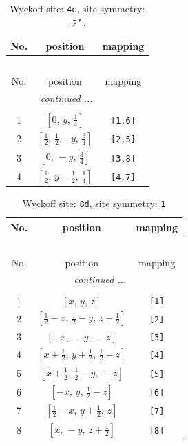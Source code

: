\documentclass[fleqn,8pt]{jsarticle}
\begin{document}
\renewcommand{\arraystretch}{1.2}
\begin{longtable}{ccc}
\caption{Wyckoff site: {\tt 4c}, site symmetry: {\tt .2'.}}
 \\
 \hline \hline
No. & position & mapping \\ \hline \endfirsthead

\multicolumn{2}{l}{\tablename\ \thetable{}} \\
 \hline \hline
No. & position & mapping \\ \hline \endhead

 \hline \hline
\multicolumn{2}{r}{\footnotesize\it continued ...} \\ \endfoot

 \hline \hline
\multicolumn{2}{r}{} \\ \endlastfoot

1 & $\left[ 0,\, y,\, \frac{1}{4} \right]$ & {\tt [1,6]} \\ \hline
2 & $\left[ \frac{1}{2},\, \frac{1}{2} - y,\, \frac{3}{4} \right]$ & {\tt [2,5]} \\ \hline
3 & $\left[ 0,\, - y,\, \frac{3}{4} \right]$ & {\tt [3,8]} \\ \hline
4 & $\left[ \frac{1}{2},\, y + \frac{1}{2},\, \frac{1}{4} \right]$ & {\tt [4,7]} \\
\end{longtable}
\renewcommand{\arraystretch}{1.2}
\begin{longtable}{ccc}
\caption{Wyckoff site: {\tt 8d}, site symmetry: {\tt 1}}
 \\
 \hline \hline
No. & position & mapping \\ \hline \endfirsthead

\multicolumn{2}{l}{\tablename\ \thetable{}} \\
 \hline \hline
No. & position & mapping \\ \hline \endhead

 \hline \hline
\multicolumn{2}{r}{\footnotesize\it continued ...} \\ \endfoot

 \hline \hline
\multicolumn{2}{r}{} \\ \endlastfoot

1 & $\left[ x,\, y,\, z \right]$ & {\tt [1]} \\ \hline
2 & $\left[ \frac{1}{2} - x,\, \frac{1}{2} - y,\, z + \frac{1}{2} \right]$ & {\tt [2]} \\ \hline
3 & $\left[ - x,\, - y,\, - z \right]$ & {\tt [3]} \\ \hline
4 & $\left[ x + \frac{1}{2},\, y + \frac{1}{2},\, \frac{1}{2} - z \right]$ & {\tt [4]} \\ \hline
5 & $\left[ x + \frac{1}{2},\, \frac{1}{2} - y,\, - z \right]$ & {\tt [5]} \\ \hline
6 & $\left[ - x,\, y,\, \frac{1}{2} - z \right]$ & {\tt [6]} \\ \hline
7 & $\left[ \frac{1}{2} - x,\, y + \frac{1}{2},\, z \right]$ & {\tt [7]} \\ \hline
8 & $\left[ x,\, - y,\, z + \frac{1}{2} \right]$ & {\tt [8]} \\
\end{longtable}
\end{document}
